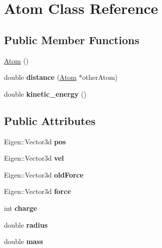 \hypertarget{class_atom}{}\section{Atom Class Reference}
\label{class_atom}
\subsection*{Public Member Functions}
\begin{DoxyCompactItemize}
\item 
\mbox{\hyperlink{class_atom_aa0147d7e49ab90f559b66e38d3d12863}{Atom}} ()
\item 
\mbox{\label{class_atom_a90a4da89f562cb57f576078e5580a0a8}} 
double {\bfseries distance} (\mbox{\hyperlink{class_atom}{Atom}} $\ast$other\+Atom)
\item 
\mbox{\label{class_atom_a4cc117bd6f7a2ce6f1af407283aff4b2}} 
double {\bfseries kinetic\+\_\+energy} ()
\end{DoxyCompactItemize}
\subsection*{Public Attributes}
\begin{DoxyCompactItemize}
\item 
\mbox{\label{class_atom_a9c44a53717ca3857065c0a36787359e1}} 
Eigen\+::\+Vector3d {\bfseries pos}
\item 
\mbox{\label{class_atom_aabc1e87e4ed861ae02f781d3f43d8481}} 
Eigen\+::\+Vector3d {\bfseries vel}
\item 
\mbox{\label{class_atom_af5b2daf8c6f32465b0ab1aecab57915b}} 
Eigen\+::\+Vector3d {\bfseries old\+Force}
\item 
\mbox{\label{class_atom_a33b530b8900b57bfa933ae79c7e95d71}} 
Eigen\+::\+Vector3d {\bfseries force}
\item 
\mbox{\label{class_atom_a482b093515f1ad043b35646669445bda}} 
int {\bfseries charge}
\item 
\mbox{\label{class_atom_a3f68fa5a0bd341c3c6b73826da8e9302}} 
double {\bfseries radius}
\item 
\mbox{\label{class_atom_a90e6f00ca3ae2fda9b87cb27aac5929d}} 
double {\bfseries mass}
\end{DoxyCompactItemize}
